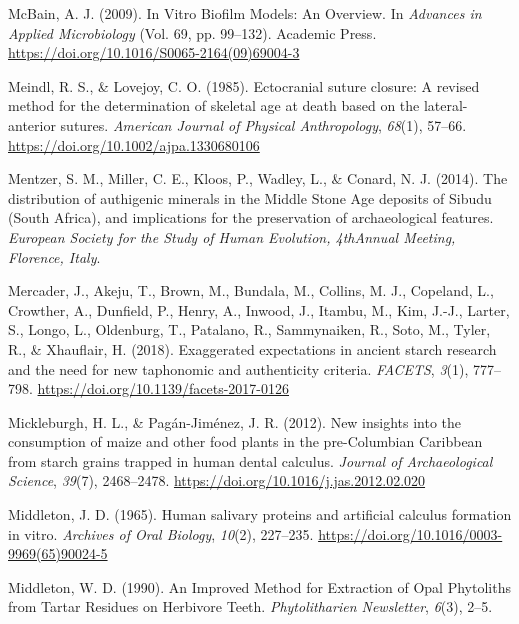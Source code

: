 \documentclass[
  letterpaper,
]{book}
\newlength{\cslhangindent}
\newlength{\cslentryspacingunit} %
\newenvironment{CSLReferences}[2] %
 {%
  \setlength{\parindent}{0pt}
  \ifodd #1
  \let\oldpar\par
  \def\par{\hangindent=\cslhangindent\oldpar}
  \fi
  \setlength{\parskip}{#2\cslentryspacingunit}
 }%
 {}
\begin{document}
\begin{CSLReferences}{1}{0}
\leavevmode{}%
McBain, A. J. (2009). In {Vitro Biofilm Models}: {An Overview}. In
\emph{Advances in {Applied Microbiology}} (Vol. 69, pp. 99--132).
{Academic Press}. \url{https://doi.org/10.1016/S0065-2164(09)69004-3}

\leavevmode{}%
Meindl, R. S., \& Lovejoy, C. O. (1985). Ectocranial suture closure: {A}
revised method for the determination of skeletal age at death based on
the lateral-anterior sutures. \emph{American Journal of Physical
Anthropology}, \emph{68}(1), 57--66.
\url{https://doi.org/10.1002/ajpa.1330680106}

\leavevmode{}%
Mentzer, S. M., Miller, C. E., Kloos, P., Wadley, L., \& Conard, N. J.
(2014). The distribution of authigenic minerals in the {Middle Stone
Age} deposits of {Sibudu} ({South Africa}), and implications for the
preservation of archaeological features. \emph{European Society for the
Study of Human Evolution, {4thAnnual} Meeting, Florence, Italy}.

\leavevmode{}%
Mercader, J., Akeju, T., Brown, M., Bundala, M., Collins, M. J.,
Copeland, L., Crowther, A., Dunfield, P., Henry, A., Inwood, J., Itambu,
M., Kim, J.-J., Larter, S., Longo, L., Oldenburg, T., Patalano, R.,
Sammynaiken, R., Soto, M., Tyler, R., \& Xhauflair, H. (2018).
Exaggerated expectations in ancient starch research and the need for new
taphonomic and authenticity criteria. \emph{FACETS}, \emph{3}(1),
777--798. \url{https://doi.org/10.1139/facets-2017-0126}

\leavevmode{}%
Mickleburgh, H. L., \& Pagán-Jiménez, J. R. (2012). New insights into
the consumption of maize and other food plants in the pre-{Columbian
Caribbean} from starch grains trapped in human dental calculus.
\emph{Journal of Archaeological Science}, \emph{39}(7), 2468--2478.
\url{https://doi.org/10.1016/j.jas.2012.02.020}

\leavevmode{}%
Middleton, J. D. (1965). Human salivary proteins and artificial calculus
formation in vitro. \emph{Archives of Oral Biology}, \emph{10}(2),
227--235. \url{https://doi.org/10.1016/0003-9969(65)90024-5}

\leavevmode{}%
Middleton, W. D. (1990). An {Improved Method} for {Extraction} of {Opal
Phytoliths} from {Tartar Residues} on {Herbivore Teeth}.
\emph{Phytolitharien Newsletter}, \emph{6}(3), 2--5.


\end{CSLReferences}
\end{document}
